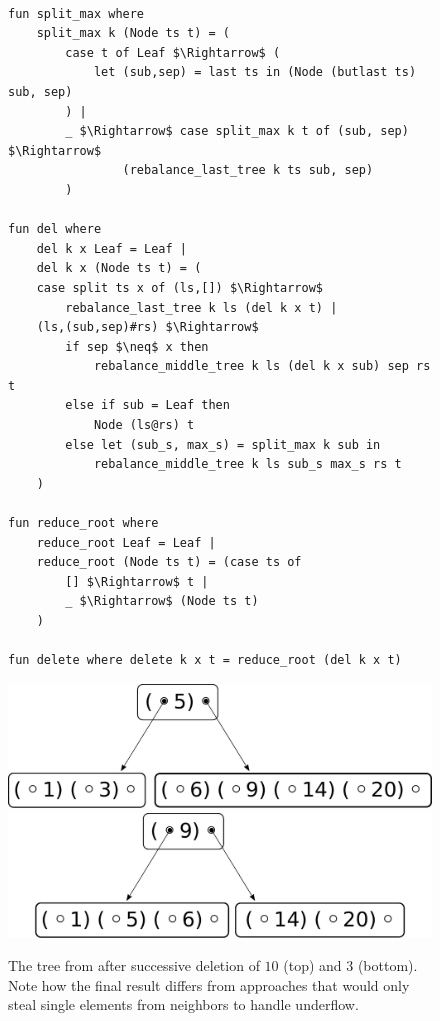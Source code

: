 \begin{figure}
\begin{lstlisting}[mathescape=true, language=Isabelle,label={lst:del-def},
    caption={The $delete$ function}]

fun split_max where
    split_max k (Node ts t) = (
        case t of Leaf $\Rightarrow$ (
            let (sub,sep) = last ts in (Node (butlast ts) sub, sep)
        ) |
        _ $\Rightarrow$ case split_max k t of (sub, sep) $\Rightarrow$
                (rebalance_last_tree k ts sub, sep)
        )

fun del where
    del k x Leaf = Leaf |
    del k x (Node ts t) = (
    case split ts x of (ls,[]) $\Rightarrow$
        rebalance_last_tree k ls (del k x t) |
    (ls,(sub,sep)#rs) $\Rightarrow$
        if sep $\neq$ x then
            rebalance_middle_tree k ls (del k x sub) sep rs t
        else if sub = Leaf then
            Node (ls@rs) t
        else let (sub_s, max_s) = split_max k sub in
            rebalance_middle_tree k ls sub_s max_s rs t
    )
 
fun reduce_root where
    reduce_root Leaf = Leaf |
    reduce_root (Node ts t) = (case ts of
        [] $\Rightarrow$ t |
        _ $\Rightarrow$ (Node ts t)
    )
 
fun delete where delete k x t = reduce_root (del k x t)
\end{lstlisting}
\end{figure}

\begin{figure}
    \centering
    \includegraphics[width=0.48\linewidth]{figures/btree-basic-ins9-ins1-del10.pdf}\\
    \vspace*{1cm}
    \includegraphics[width=0.48\linewidth]{figures/btree-basic-ins9-ins1-del10-del3.pdf}
    \caption[An example B-Tree after two deletion operations]{The tree from  after 
    successive deletion of $10$ (top) and $3$ (bottom).
    Note how the final result differs from approaches that would only steal single elements
    from neighbors to handle underflow.}
    \label{fig:btree-basic-del}
\end{figure}

